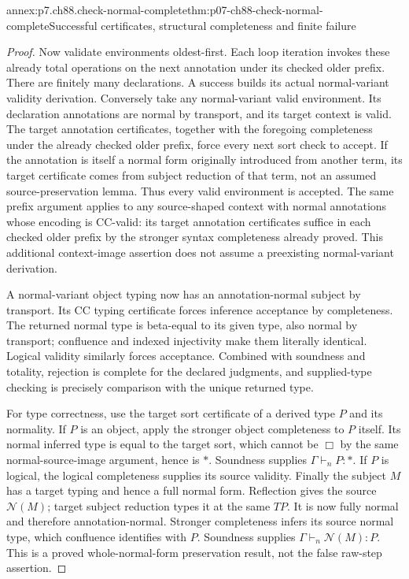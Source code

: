 \begin{annexitem}{annex:p7.ch88.check-normal-complete}{thm:p07-ch88-check-normal-complete}{Successful certificates, structural completeness and finite failure}
\begin{proof}
Now validate environments oldest-first. Each loop iteration invokes
these already total operations on the next annotation under its
checked older prefix. There are finitely many declarations. A success
builds its actual normal-variant validity derivation. Conversely take
any normal-variant valid environment. Its declaration annotations
are normal by transport, and its target context is valid. The target
annotation certificates, together with the foregoing completeness
under the already checked older prefix, force every next sort check
to accept. If the annotation is itself a normal form originally
introduced from another term, its target certificate comes from
subject reduction of that term, not an assumed source-preservation
lemma. Thus every valid environment is accepted. The same prefix argument
applies to any source-shaped context with normal annotations whose
encoding is CC-valid: its target annotation certificates suffice in
each checked older prefix by the stronger syntax completeness already
proved. This additional context-image assertion does not assume a
preexisting normal-variant derivation.

A normal-variant object typing now has an annotation-normal subject
by transport. Its CC typing certificate forces inference acceptance
by completeness. The returned normal type is beta-equal to its given
type, also normal by transport; confluence and indexed injectivity
make them literally identical. Logical validity similarly forces
acceptance. Combined with soundness and totality, rejection is
complete for the declared judgments, and supplied-type checking
is precisely comparison with the unique returned type.

For type correctness, use the target sort certificate of a derived
type \(P\) and its normality. If \(P\) is an object, apply the
stronger object completeness to \(P\) itself. Its normal inferred
type is equal to the target sort, which cannot be \(\Box\) by
the same normal-source-image argument, hence is \(\ast\).
Soundness supplies \(\Gamma\vdash_n P:\ast\). If \(P\) is
logical, the logical completeness supplies its source validity.
Finally the subject \(M\) has a target typing and hence a full
normal form. Reflection gives the source \(\mathcal N(M)\);
target subject reduction types it at the same \(TP\).
It is now fully normal and therefore annotation-normal. Stronger
completeness infers its source normal type, which confluence identifies
with \(P\). Soundness supplies
\(\Gamma\vdash_n\mathcal N(M):P\). This is a proved whole-normal-form
preservation result, not the false raw-step assertion.
\end{proof}
\end{annexitem}

